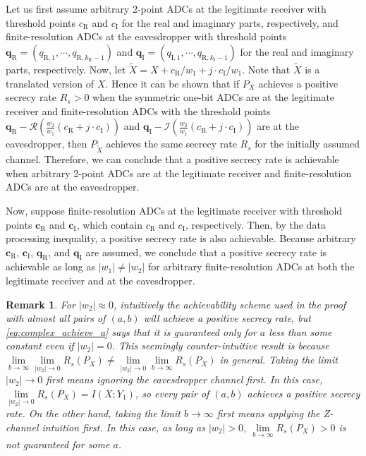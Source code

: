\documentclass[journal]{IEEEtran}
\newtheorem{remark}{Remark}
\begin{document}
\begin{IEEEproof}
Let us first assume arbitrary 2-point ADCs at the legitimate receiver with threshold points $c_{\mathrm{R}}$ and $c_{\mathrm{I}}$ for the real and imaginary parts, respectively, and finite-resolution ADCs at the eavesdropper with threshold points ${\mathbf{q}_{\mathrm{R}} = (q_{\mathrm{R},1}, \cdots , q_{\mathrm{R},k_\mathrm{R}-1})}$ and ${\mathbf{q}_{\mathrm{I}} = (q_{\mathrm{I},1}, \cdots , q_{\mathrm{R},k_\mathrm{I}-1})}$ for the real and imaginary parts, respectively. 
Now, let ${\tilde{X}= X + c_{\mathrm{R}}/w_1 + j \cdot c_{\mathrm{I}}/w_1}$. Note that $\tilde{X}$ is a translated version of $X$. Hence it can be shown that if $P_X$ achieves a positive secrecy rate $R_s>0$ when the symmetric one-bit ADCs are at the legitimate receiver and finite-resolution ADCs with the threshold points $\mathbf{q}_{\mathrm{R}} - \mathcal{R}\left(\frac{w_2}{w_1}(c_{\mathrm{R}} + j \cdot c_{\mathrm{I}}) \right)$ and $\mathbf{q}_{\mathrm{I}} - \mathcal{I}\left(\frac{w_2}{w_1}(c_{\mathrm{R}} + j \cdot c_{\mathrm{I}}) \right)$ are at the eavesdropper, then $P_{\tilde{X}}$ achieves the same secrecy rate $R_s$ for the initially assumed channel. Therefore, we can conclude that a positive secrecy rate is achievable when arbitrary 2-point ADCs are at the legitimate receiver and finite-resolution ADCs are at the eavesdropper. 

Now, suppose finite-resolution ADCs at the legitimate receiver with threshold points  $\mathbf{c}_{\mathrm{R}}$ and $\mathbf{c}_{\mathrm{I}}$, which contain $c_{\mathrm{R}}$ and $c_{\mathrm{I}}$, respectively. Then, by the data processing inequality, a positive secrecy rate is also achievable. Because arbitrary $\mathbf{c}_{\mathrm{R}}$, $\mathbf{c}_{\mathrm{I}}$, $\mathbf{q}_{\mathrm{R}}$, and $\mathbf{q}_{\mathrm{I}}$ are assumed, we conclude that a positive secrecy rate is achievable as long as $|w_1|\neq |w_2|$ for arbitrary finite-resolution ADCs at both the legitimate receiver and at the eavesdropper.
\end{IEEEproof}

\begin{remark}
For $|w_2| \approx 0$, intuitively the achievability scheme used in the proof with almost all pairs of $(a,b)$ will achieve a positive secrecy rate, but \eqref{eq:complex_achieve_a} says that it is guaranteed only for $a$ less than some constant even if $|w_2|=0$. This seemingly counter-intuitive result is because \mbox{${\lim\limits_{b\rightarrow\infty}\lim\limits_{|w_2|\rightarrow 0} R_s(P_X) \neq \lim\limits_{|w_2|\rightarrow 0}\lim\limits_{b\rightarrow\infty} R_s(P_X)}$} in general. 
Taking the limit $|w_2| \rightarrow 0$ first means  ignoring the eavesdropper channel first. In this case, ${\lim\limits_{|w_2|\rightarrow 0} R_s(P_X)=I(X;Y_1)}$, so every pair of $(a,b)$ achieves a positive secrecy rate.
On the other hand, taking the limit $b\rightarrow \infty$ first means applying the Z-channel intuition first. In this case, as long as $|w_2|>0$, $\lim\limits_{b\rightarrow \infty} R_s(P_X)>0$ is not guaranteed for some $a$.
\end{remark}
\end{document}
